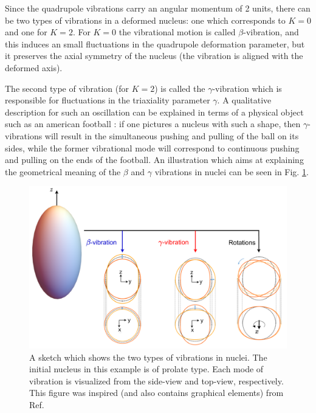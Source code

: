 Since the quadrupole vibrations carry an angular momentum of 2 units, there can be two types of vibrations in a deformed nucleus: one which corresponds to $K=0$ and one for $K=2$. For $K=0$ the vibrational motion is called $\beta$-vibration, and this induces an small fluctuations in the quadrupole deformation parameter, but it preserves the axial symmetry of the nucleus (the vibration is aligned with the deformed axis).

The second type of vibration (for $K=2$) is called the $\gamma$-vibration which is responsible for fluctuations in the triaxiality parameter $\gamma$. A qualitative description for such an oscillation can be explained in terms of a physical object such as an american football \cite{krane1991introductory}: if one pictures a nucleus with such a shape, then $\gamma$-vibrations will result in the simultaneous pushing and pulling of the ball on its sides, while the former vibrational mode will correspond to continuous pushing and pulling on the ends of the football. An illustration which aims at explaining the geometrical meaning of the $\beta$ and $\gamma$ vibrations in nuclei can be seen in Fig. \ref{rotation-vibration-geometrics}.

\begin{figure}
    \centering
    \includegraphics[scale=0.405]{Chapters/Figures/rotationsVibrations_Rotations.pdf}
    \caption{A sketch which shows the two types of vibrations in nuclei. The initial nucleus in this example is of prolate type. Each mode of vibration is visualized from the side-view and top-view, respectively. This figure was inspired (and also contains graphical elements) from Ref. \cite{li2022model}}
    \label{rotation-vibration-geometrics}
\end{figure}


